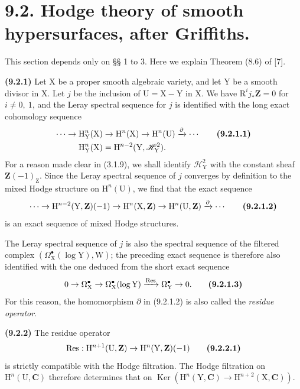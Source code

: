 \documentclass[11pt,leqno]{article}
\begin{document}
\section*{9.2. Hodge theory of smooth hypersurfaces, after Griffiths.}

This section depends only on §§ 1 to 3. Here we explain Theorem (8.6) of [7].

\textbf{(9.2.1)} Let \(\mathrm{X}\) be a proper smooth algebraic variety, and let \(\mathrm{Y}\) be a smooth divisor in \(\mathrm{X}\). Let \(j\) be the inclusion of \(\mathrm{U}=\mathrm{X}-\mathrm{Y}\) in \(\mathrm{X}\). We have \(\mathrm{R}^{i}j_{*}\mathbf{Z}=0\) for \(i\neq0,\ 1\), and the Leray spectral sequence for \(j\) is identified with the long exact cohomology sequence
\begin{align*}
\cdots\to\mathrm{H}_{\mathrm{Y}}^{n}(\mathrm{X})
&\to\mathrm{H}^{n}(\mathrm{X})
\to\mathrm{H}^{n}(\mathrm{U})
\xrightarrow{\partial}\cdots
\tag*{\textbf{(9.2.1.1)}}\\
\mathrm{H}_{\mathrm{Y}}^{n}(\mathrm{X})
&=\mathrm{H}^{n-2}(\mathrm{Y},\mathscr{H}_{\mathrm{Y}}^{2}).
\end{align*}
For a reason made clear in (3.1.9), we shall identify \(\mathscr{H}_{\mathrm{Y}}^{2}\) with the constant sheaf \(\mathbf{Z}(-1)_{\mathrm{Z}}\). Since the Leray spectral sequence of \(j\) converges by definition to the mixed Hodge structure on \(\mathrm{H}^{n}(\mathrm{U})\), we find that the exact sequence
\[
\cdots\to
\mathrm{H}^{n-2}(\mathrm{Y},\mathbf{Z})(-1)
\to\mathrm{H}^{n}(\mathrm{X},\mathbf{Z})
\to\mathrm{H}^{n}(\mathrm{U},\mathbf{Z})
\xrightarrow{\partial}\cdots
\tag*{\textbf{(9.2.1.2)}}
\]
is an exact sequence of mixed Hodge structures.

The Leray spectral sequence of \(j\) is also the spectral sequence of the filtered complex \((\Omega_{\mathrm{X}}^{\bullet}(\log\mathrm{Y}),\mathrm{W})\); the preceding exact sequence is therefore also identified with the one deduced from the short exact sequence
\[
0\to\Omega_{\mathrm{X}}^{\bullet}
\to\Omega_{\mathrm{X}}^{\bullet}(\log\mathrm{Y})
\xrightarrow{\operatorname{Res}}
\Omega_{\mathrm{Y}}^{\bullet}\to0.
\tag*{\textbf{(9.2.1.3)}}
\]
For this reason, the homomorphism \(\partial\) in (9.2.1.2) is also called the \textit{residue operator}.

\textbf{(9.2.2)} The residue operator
\[
\operatorname{Res}:\mathrm{H}^{n+1}(\mathrm{U},\mathbf{Z})
\to\mathrm{H}^{n}(\mathrm{Y},\mathbf{Z})(-1)
\tag*{\textbf{(9.2.2.1)}}
\]
is strictly compatible with the Hodge filtration. The Hodge filtration on \(\mathrm{H}^{n}(\mathrm{U},\mathbf{C})\) therefore determines that on \(\operatorname{Ker}(\mathrm{H}^{n}(\mathrm{Y},\mathbf{C})\to\mathrm{H}^{n+2}(\mathrm{X},\mathbf{C}))\).
\end{document}
